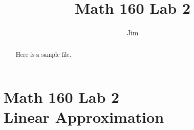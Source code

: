 \documentclass{ximera}
\title{Math 160 Lab 2}
\author{Jim}
\begin{document}
\begin{abstract}
Here is a sample file.
\end{abstract}

\maketitle

\section{Math 160 Lab 2 \\ Linear Approximation}

\lipsum[2-4]
\end{document}
